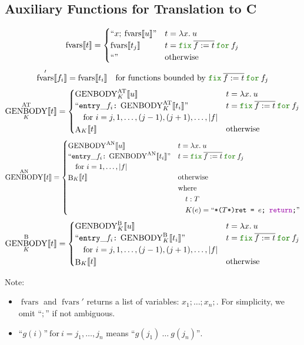 \documentclass[a4paper,fleqn]{article}
\newcommand{\kwfix}{\mbox{\color{mygreen}\ttfamily fix}}
\newcommand{\kwfor}{\mbox{\color{mygreen}\ttfamily for}}
\newcommand{\lam}[2]{\lambda #1.\:#2}
\newcommand{\ofix}[2]{\kwfix\:{#1}\:\kwfor\:{#2}}
\newcommand{\BRA}[1]{\llbracket #1 \rrbracket}
\DeclareMathOperator{\genbody}{GENBODY}
\newcommand{\genbodyat}[2]{\genbody^\mathrm{AT}_{#1}\BRA{#2}}
\newcommand{\genbodyan}[1]{\genbody^\mathrm{AN}\BRA{#1}}
\newcommand{\genbodyb}[2]{\genbody^\mathrm{B}_{#1}\BRA{#2}}
\newcommand{\dq}[1]{\text{``}#1\text{''}}
\newcommand{\ttcolon}{\texttt{:}}
\newcommand{\kwCreturn}{\mbox{\color{myviolet}\ttfamily return}}
\DeclareMathOperator{\fvarsop}{fvars}
\newcommand{\fvars}[1]{\fvarsop\BRA{#1}}
\newcommand{\fvarsd}[1]{\fvarsop'\BRA{#1}}
\DeclareMathOperator{\Aop}{A}
\DeclareMathOperator{\Bop}{B}
\newcommand{\A}[2]{\Aop_{#1}\BRA{#2}}
\newcommand{\B}[2]{\Bop_{#1}\BRA{#2}}
\newcommand{\rep}[1]{\overline{#1}}
\begin{document}
\subsection{Auxiliary Functions for Translation to C}\label{sec:aux-function}
\[
  \fvars{t} =
  \begin{cases}
    \dq{x;\:\fvars{u}} & t = \lam{x}{u} \\
    \fvars{t_j}       & t = \ofix{\rep{f:=t}}{f_j} \\
    \dq{}             & \text{otherwise}
  \end{cases}
\]
\[
  \fvarsd{f_i} = \fvars{t_i} \quad \text{for functions bounded by $\ofix{\rep{f:=t}}{f_j}$}
\]
\[
  \genbodyat{K}{t} =
  \begin{cases}
    \genbodyat{K}{u}                            & t = \lam{x}{u} \\
    \dq{\mathtt{entry\_}f_i\ttcolon\:\genbodyat{K}{t_i}} & t = \ofix{\rep{f:=t}}{f_j} \\
    \quad \text{for}~i=j, 1,\dotsc, (j-1), (j+1),\dotsc, |f| \\
    \A{K}{t}                            & \text{otherwise}
  \end{cases}
\]
\[
  \genbodyan{t} =
  \begin{cases}
    \genbodyan{u}                            & t = \lam{x}{u} \\
    \dq{\mathtt{entry\_}f_i\ttcolon\:\genbodyan{t_i}} & t = \ofix{\rep{f:=t}}{f_j} \\
    \quad \text{for}~i=1,\dotsc, |f| \\
    \B{K}{t}                            & \begin{aligned}[t]
                                            & \text{otherwise} \\
                                            & \text{where} \\
                                            & \quad t:T \\
                                            & \quad K(e) = \dq{\texttt{*($T$*)ret = $e$; \kwCreturn;}}
                                            \end{aligned}
  \end{cases}
\]
\[
  \genbodyb{K}{t} =
  \begin{cases}
    \genbodyb{K}{u}                            & t = \lam{x}{u} \\
    \dq{\mathtt{entry\_}f_i\ttcolon\:\genbodyb{K}{t_i}} & t = \ofix{\rep{f:=t}}{f_j} \\
    \quad \text{for}~i=j, 1,\dotsc, (j-1), (j+1),\dotsc, |f| \\
    \B{K}{t}                            & \text{otherwise}
  \end{cases}
\]
{\small Note:
\begin{itemize}
  \item $\fvarsop$ and $\fvarsop'$ returns a list of variables: $x_1;\ldots;x_n;$.  For simplicity, we omit ``$;$'' if not ambiguous.
  \item $\dq{g(i)}~\text{for}~i=j_1,\dotsc,j_n$ means $\dq{g(j_1)\:\ldots\:g(j_n)}$.
\end{itemize}}
\end{document}
